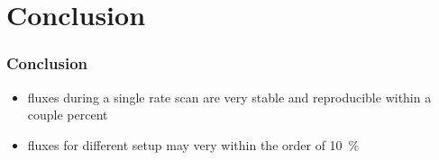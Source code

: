 \documentclass[9pt]{beamer}
\begin{document}
\section{Conclusion}
\begin{frame}
	\frametitle{Conclusion}
	\begin{minipage}[c][.2\textheight]{\textwidth}
		\begin{itemize}
			\setlength{\itemsep}{\fill}
			\item fluxes during a single rate scan are very stable and reproducible within a couple percent
			\item fluxes for different setup may very within the order of \SI{10}{\%}
		\end{itemize}
	\end{minipage}
\end{frame}
\end{document}
